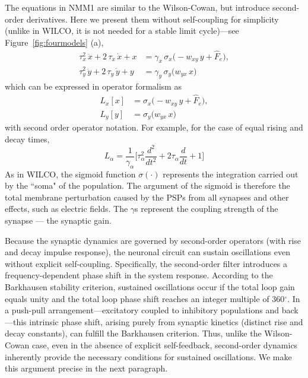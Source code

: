 \documentclass[11pt]{article}
\numberwithin{equation}{section}
\begin{document}
 
The equations in NMM1  are similar to the Wilson-Cowan, but introduce second-order derivatives. Here we present them without self-coupling for simplicity (unlike in WILCO, it is not needed for a stable limit cycle)---see Figure~\ref{fig:fourmodels} (a),
\begin{equation}
    \begin{aligned}
            \tau_x^{2}\,\ddot{x} + 2\,\tau_x\,\dot{x} +x
              &= \gamma_x\,\sigma_x\bigl(  - w_{xy}\,y + \hat F_e \bigr),\\
            \tau_y^{2}\,\ddot{y} + 2\,\tau_y\,\dot{y} +y
              &= \gamma_y\,\sigma_y\bigl(w_{yx}\,x  \bigr) 
          \end{aligned}
\end{equation}
which can be expressed in operator formalism as
\begin{equation} \label{eq:nmm1-simple}
    \begin{aligned}
            L_x[x]
              &= \sigma_x\bigl(  - w_{xy}\,y + \hat F_e \bigr),\\
           L_y[y] &= \sigma_y\bigl(w_{yx}\,x  \bigr) 
          \end{aligned}
\end{equation}
with second order operator notation. For example, for the case of equal rising and decay times, 
\begin{equation}\label{eq:L-operator-same-a}
L_\alpha = \frac{1}{\gamma_\alpha} \big [ \tau_\alpha^2 \frac{d^2}{dt^2} + 2 \tau_\alpha \frac{d}{dt} + 1 \big]
\end{equation}
As in WILCO, the sigmoid function $\sigma(\cdot)$ represents the integration carried out by the ``soma" of the population. The argument of the sigmoid is therefore the total membrane perturbation caused by the PSPs from all synapses and other effects, such as electric fields.  The  $\gamma$s represent the coupling strength of the synapse --- the synaptic gain.  


Because the synaptic dynamics are governed by second-order operators (with rise and decay impulse response), the neuronal circuit can sustain oscillations even without explicit self-coupling. Specifically, the second-order filter introduces a frequency-dependent phase shift in the system response. According to the Barkhausen stability criterion, sustained oscillations occur if the total loop gain equals unity and the total loop phase shift reaches an integer multiple of 360$^\circ$. In a push-pull arrangement—excitatory coupled to inhibitory populations and back—this intrinsic phase shift, arising purely from synaptic kinetics (distinct rise and decay constants), can fulfill the Barkhausen criterion. Thus, unlike the Wilson-Cowan case,  even in the absence of explicit self-feedback, second-order dynamics inherently provide the necessary conditions for sustained oscillations. We make this argument precise in the next paragraph.
\end{document}
